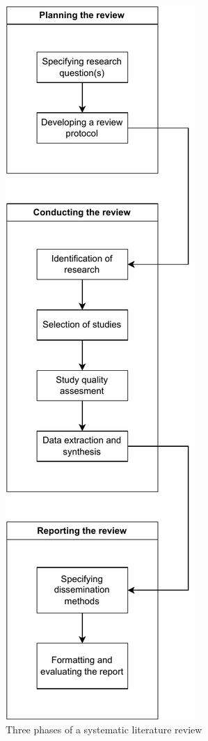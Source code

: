 \begin{figure}
	\centering
	\includegraphics[scale=0.9]{figures/slr-phases.pdf}
	\caption{Three phases of a systematic literature review}
	\label{fig:slrphases}
\end{figure}

